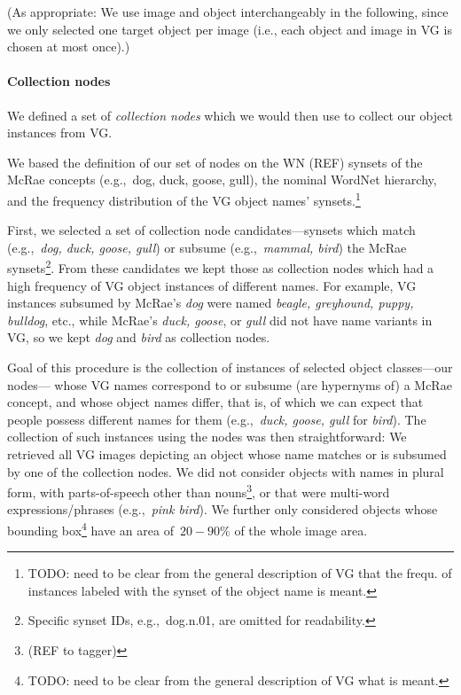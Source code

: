 (As appropriate: We use image and object interchangeably in the following, since we only selected one target object per image (i.e., each object and image in VG is chosen at most once).)

\paragraph{Collection nodes}
We defined a set of \textit{collection nodes} which we would then use to collect our object instances from VG. 

We based the definition of our set of nodes on the WN (REF) synsets of the McRae concepts (e.g.,~dog, duck, goose, gull), the nominal WordNet hierarchy, and the frequency distribution of the VG object names' synsets.\footnote{TODO: need to be clear from the general description of VG that the frequ. of instances labeled with the synset of the object name is meant.} 

First, we selected a set of collection node candidates---synsets which match (e.g.,~\textsl{dog, duck, goose, gull}) or subsume (e.g.,~\textsl{mammal, bird}) the McRae synsets\footnote{Specific synset IDs, e.g.,~dog.n.01, are omitted for readability.}. 
From these candidates we kept those as collection nodes which had a high frequency of VG object instances of different names. For example, VG instances  subsumed by McRae's \textsl{dog} were named \textsl{beagle, greyhound, puppy, bulldog}, etc., while McRae's \textsl{duck, goose}, or \textsl{gull} did not have name variants in VG, so we kept \textsl{dog} and \textsl{bird} as collection nodes.

Goal of this procedure is the collection of instances of selected object classes---our nodes--- whose VG names correspond to or subsume (are hypernyms of) a McRae concept, and whose object names differ, that is, of which we can expect that people possess different names for them (e.g.,~\textsl{duck, goose, gull} for \textsl{bird}).
The collection of such instances using the nodes was then straightforward: We retrieved all VG images  depicting an object whose name matches or is subsumed by one of the collection nodes. 
We did not consider objects with names in plural form, with parts-of-speech other than nouns\footnote{(REF to tagger)}, or that were multi-word expressions/phrases (e.g.,~\textsl{pink bird}). 
We further only considered objects whose bounding box\footnote{TODO: need to be clear from the general description of VG what is meant.} have an area of~$20-90\%$ of the whole image area.

